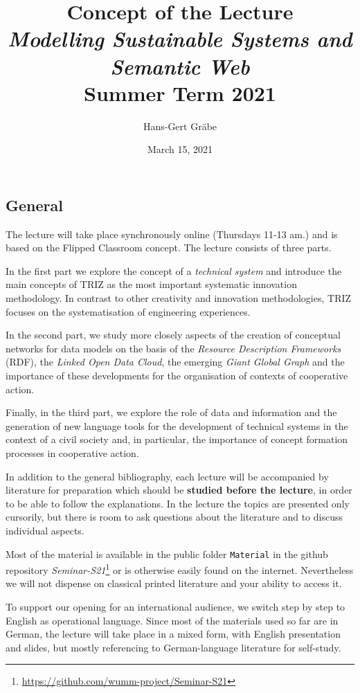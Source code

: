 \documentclass[11pt,a4paper]{article}
\title{Concept of the Lecture \\[1em] \emph{Modelling Sustainable Systems and
    Semantic Web} \\[1em] Summer Term 2021}
\author{Hans-Gert Gr\"abe}
\date{March 15, 2021}
\begin{document}
\maketitle

\subsection{General}

The lecture will take place synchronously online (Thursdays 11-13 am.) and is
based on the Flipped Classroom concept. The lecture consists of three parts.

In the first part we explore the concept of a \emph{technical system} and
introduce the main concepts of TRIZ as the most important systematic
innovation methodology.  In contrast to other creativity and innovation
methodologies, TRIZ focuses on the systematisation of engineering experiences.

In the second part, we study more closely aspects of the creation of
conceptual networks for data models on the basis of the \emph{Resource
  Description Frameworks} (RDF), the \emph{Linked Open Data Cloud}, the
emerging \emph{Giant Global Graph} and the importance of these developments
for the organisation of contexts of cooperative action.

Finally, in the third part, we explore the role of data and information and
the generation of new language tools for the development of technical systems
in the context of a civil society and, in particular, the importance of
concept formation processes in cooperative action.

In addition to the general bibliography, each lecture will be accompanied by
literature for preparation which should be \textbf{studied before the
  lecture}, in order to be able to follow the explanations. In the lecture the
topics are presented only cursorily, but there is room to ask questions about
the literature and to discuss individual aspects.

Most of the material is available in the public folder \texttt{Material} in
the github repository
\emph{Seminar-S21}\footnote{\url{https://github.com/wumm-project/Seminar-S21}}
or is otherwise easily found on the internet. Nevertheless we will not
dispense on classical printed literature and your ability to access it.

To support our opening for an international audience, we switch step by step
to English as operational language. Since most of the materials used so far
are in German, the lecture will take place in a mixed form, with English
presentation and slides, but mostly referencing to German-language literature
for self-study.
\end{document}
